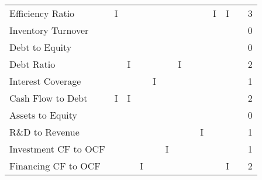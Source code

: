 \documentclass[12pt,a4paper,english]{article}
\begin{document}
\begin{table}[H]
\begin{minipage}{\textwidth}
{\begin{tabular}{@{}lrrrrrrrrrrr|r@{}}
				Efficiency Ratio                               & I                                 &                               &                                 &                                    &   &   &   &   & I & I &   & 3 \\
				Inventory Turnover                             &                                   &                               &                                 &                                    &   &   &   &   &   &   &   & 0 \\
				Debt to Equity                                 &                                   &                               &                                 &                                    &   &   &   &   &   &   &   & 0 \\
				Debt Ratio                                     &                                   & I                             &                                 &                                    &   & I &   &   &   &   &   & 2 \\
				Interest Coverage                              &                                   &                               &                                 & I                                  &   &   &   &   &   &   &   & 1 \\
				Cash Flow to Debt                              & I                                 & I                             &                                 &                                    &   &   &   &   &   &   &   & 2 \\
				Assets to Equity                               &                                   &                               &                                 &                                    &   &   &   &   &   &   &   & 0 \\
				R\&D to Revenue                                &                                   &                               &                                 &                                    &   &   &   & I &   &   &   & 1 \\
				Investment CF to OCF                           &                                   &                               &                                 &                                    & I &   &   &   &   &   &   & 1 \\
				Financing CF to OCF                            &                                   &                               & I                               &                                    &   &   &   &   &   & I &   & 2 \\

\end{tabular}}
\end{minipage}
\end{table}
\end{document}
